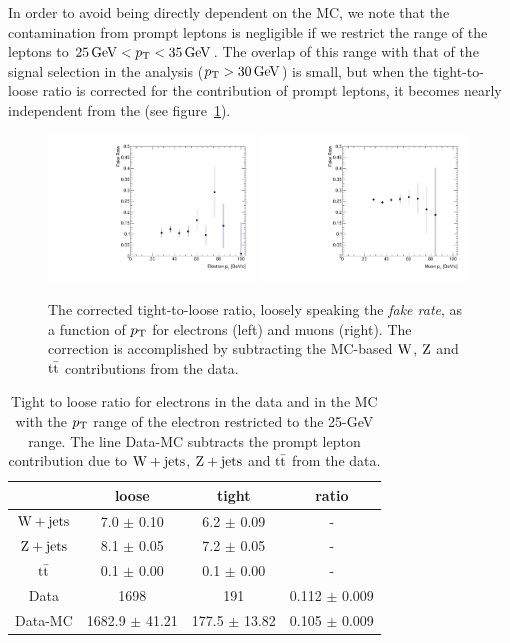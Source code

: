 In order to avoid being directly dependent on the MC, we note that the
contamination from prompt leptons is negligible if we restrict the \pt range
of the leptons to $\unit[25]{GeV} < \pt < \unit[35]{GeV}$. The overlap of
this \pt range with that of the signal selection in the analysis ($\pt >
\unit[30]{GeV}$) is small, but when the tight-to-loose ratio is corrected
for the contribution of prompt leptons, it becomes nearly independent from
the \pt (see figure~\ref{fig:CorFRvsLepPt}).
\begin{figure}[htb]
    \centering
\includegraphics[width=0.49\textwidth]{images/pdf/h_FR_ElPt} \hfill
\includegraphics[width=0.49\textwidth]{images/pdf/h_FR_MuPt} \\ 
\caption{The corrected tight-to-loose ratio, loosely speaking the
    \emph{fake rate}, as a function of $p_\mathrm{T}$ for electrons (left) and muons (right). The correction is accomplished by subtracting the MC-based 
         $\mathrm{W}$, $\mathrm{Z}$ and $\mathrm{t}\bar{\mathrm{t}}$ contributions from the data.}
\label{fig:CorFRvsLepPt}
\end{figure}
\begin{table}[htb]
    \centering
\begin{tabular}{*4c}
    \toprule
 & 	 loose & 	 tight & 	 ratio \\
 \midrule
$\mathrm{W} + \text{jets}$ & 	 7.0 $\pm$ 0.10 & 	 6.2 $\pm$ 0.09 & 	- \\
$\mathrm{Z} + \text{jets}$ & 	 8.1 $\pm$ 0.05 & 	 7.2 $\pm$ 0.05 & 	- \\
$\mathrm{t}\bar{\mathrm{t}}$ & 	 0.1 $\pm$ 0.00 & 	 0.1 $\pm$ 0.00 & 	- \\
\midrule
Data & 	 1698 & 	  191 & 	0.112 $\pm$ 0.009 \\
Data-MC &	1682.9 $\pm$ 41.21 & 	177.5 $\pm$ 13.82 & 	0.105 $\pm$ 0.009 \\
\bottomrule
\end{tabular}
\caption{Tight to loose ratio for electrons in the data and in the MC with
    the $p_\mathrm{T}$ range of
    the electron restricted to the 25-\unit[35]{GeV} range.
The line Data-MC subtracts the prompt lepton contribution due to $\mathrm{W} + \text{jets}$,
$\mathrm{Z} + \text{jets}$ and $\mathrm{t}\bar{\mathrm{t}}$ from the data.}
\label{tab:FRwMCEl_Pt2535}
\end{table}


